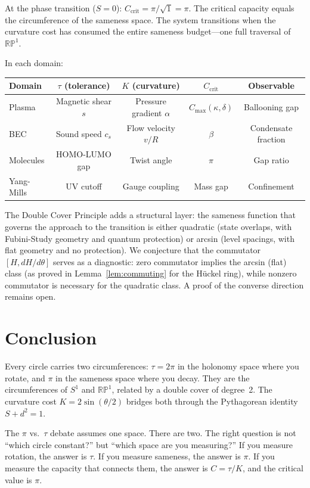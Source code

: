 \documentclass[11pt,letterpaper]{article}
\begin{document}
At the phase transition ($S = 0$): $C_{\text{crit}} = \pi/\sqrt{1} = \pi$. The critical capacity equals the circumference of the sameness space. The system transitions when the curvature cost has consumed the entire sameness budget---one full traversal of $\mathbb{RP}^1$.

In each domain:
\begin{center}
\begin{tabular}{lcccc}
\toprule
\textbf{Domain} & $\tau$ (tolerance) & $K$ (curvature) & $C_{\text{crit}}$ & Observable \\
\midrule
Plasma & Magnetic shear $s$ & Pressure gradient $\alpha$ & $C_{\max}(\kappa, \delta)$ & Ballooning gap \\
BEC & Sound speed $c_s$ & Flow velocity $v/R$ & $\beta$ & Condensate fraction \\
Molecules & HOMO-LUMO gap & Twist angle & $\pi$ & Gap ratio \\
Yang-Mills & UV cutoff & Gauge coupling & Mass gap & Confinement \\
\bottomrule
\end{tabular}
\end{center}

The Double Cover Principle adds a structural layer: the sameness function that governs the approach to the transition is either quadratic (state overlaps, with Fubini-Study geometry and quantum protection) or arcsin (level spacings, with flat geometry and no protection). We conjecture that the commutator $[H, dH/d\theta]$ serves as a diagnostic: zero commutator implies the arcsin (flat) class (as proved in Lemma~\ref{lem:commuting} for the Hückel ring), while nonzero commutator is necessary for the quadratic class. A proof of the converse direction remains open.


\section{Conclusion}

Every circle carries two circumferences: $\tau = 2\pi$ in the holonomy space where you rotate, and $\pi$ in the sameness space where you decay. They are the circumferences of $S^1$ and $\mathbb{RP}^1$, related by a double cover of degree~2. The curvature cost $K = 2\sin(\theta/2)$ bridges both through the Pythagorean identity $S + d^2 = 1$.

The $\pi$ vs.\ $\tau$ debate assumes one space. There are two. The right question is not ``which circle constant?'' but ``which space are you measuring?'' If you measure rotation, the answer is $\tau$. If you measure sameness, the answer is $\pi$. If you measure the capacity that connects them, the answer is $C = \tau/K$, and the critical value is $\pi$.
\end{document}
